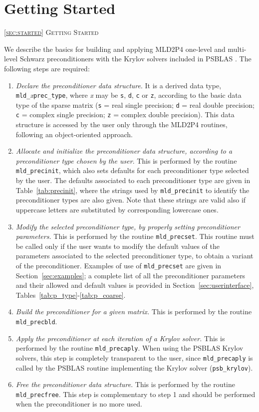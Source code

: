 \section{Getting Started\label{sec:started}}
         {\textsc{\ref{sec:started} Getting Started}}

We describe the basics for building and applying MLD2P4 one-level and multi-level
Schwarz preconditioners with the Krylov solvers included in PSBLAS \cite{PSBLASGUIDE}.
The following steps are required:
\begin{enumerate} 
\item \emph{Declare the preconditioner data structure}. It is a derived data type,
  \verb|mld_|\-\emph{x}\verb|prec_type|, where \emph{x} may be \verb|s|, \verb|d|, \verb|c|
	or \verb|z|, according to the basic data type of the sparse matrix
	(\verb|s| = real single precision; \verb|d| = real double precision;
	\verb|c| = complex single precision; \verb|z| = complex double precision).
	This data structure is accessed by the user only through the MLD2P4 routines,
	following an object-oriented approach.
\item \emph{Allocate and initialize the preconditioner data structure, according to
	a preconditioner type chosen by the user}. This is performed by the routine
	\verb|mld_precinit|, which also sets defaults for each preconditioner
	type selected by the user. The defaults associated to each preconditioner
	type are given in Table~\ref{tab:precinit}, where the strings used by
	\verb|mld_precinit| to identify the preconditioner types are also given.
	Note that these strings are valid also if uppercase letters are substituted by
	corresponding lowercase ones.
\item \emph{Modify the selected preconditioner type, by properly setting
  preconditioner parameters.} This is performed by the routine \verb|mld_precset|.
  This routine must be called only if the user wants to modify the default values
  of the parameters associated to the selected preconditioner type, to obtain a variant
  of the preconditioner. Examples of use of \verb|mld_precset| are given in
  Section~\ref{sec:examples}; a complete list of all the
  preconditioner parameters and their allowed and default values is provided in 
  Section~\ref{sec:userinterface}, Tables~\ref{tab:p_type}-\ref{tab:p_coarse}. 
\item \emph{Build the preconditioner for a given matrix.} This is performed by
  the routine \verb|mld_precbld|.
\item \emph{Apply the preconditioner at each iteration of a Krylov solver.}
  This is performed by the routine \verb|mld_precaply|. When using the PSBLAS Krylov solvers,
  this step is completely transparent to the user, since \verb|mld_precaply| is called
  by the PSBLAS routine implementing the Krylov solver (\verb|psb_krylov|).
\item \emph{Free the preconditioner data structure}. This is performed by
  the routine \verb|mld_precfree|. This step is complementary to step 1 and should
  be performed when the preconditioner is no more used.
\end{enumerate}
